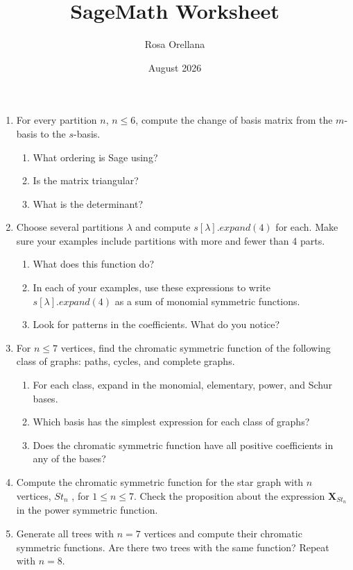 \documentclass{article}
\title{SageMath Worksheet}
\author{Rosa Orellana}
\date{August 2026}
\begin{document}
\maketitle

\begin{enumerate}
    \item For every partition $n$, $n\leq 6$, compute the change of basis matrix from the $m$-basis to the $s$-basis.  
    \begin{enumerate}
    \item What ordering is Sage using? 
    \item Is the matrix triangular? 
    \item What is the determinant? 
    \end{enumerate}
    \item Choose several partitions $\lambda$ and compute $s[\lambda].expand(4)$ for each. Make sure your examples include partitions with more and fewer than 4 parts.
    \begin{enumerate}
        \item What does this function do? 
        \item In each of your examples, use these expressions to write $s[\lambda].expand(4)$ as a sum of monomial symmetric functions. 
        \item Look for patterns in the coefficients. What do you notice? 
    \end{enumerate}
    \item For $n\leq 7$ vertices, find the chromatic symmetric function of the following class of graphs: paths, cycles, and complete graphs. 
    \begin{enumerate}
    \item For each class, expand in the monomial, elementary, power, and Schur bases.  
    \item Which basis has the simplest expression for each class of graphs? 
    \item Does the chromatic symmetric function have all positive coefficients in any of the bases? 
    \end{enumerate}

    \item Compute the chromatic symmetric function for the star graph with $n$ vertices, $St_n$ , for $1\leq n \leq 7$. Check the proposition about the expression $\mathbf{X}_{St_n}$ in the power symmetric function. 
\item Generate all trees with $n = 7$ vertices and compute their chromatic symmetric functions.  Are there two trees with the same function? Repeat with $n=8$.


\end{enumerate}
\end{document}
